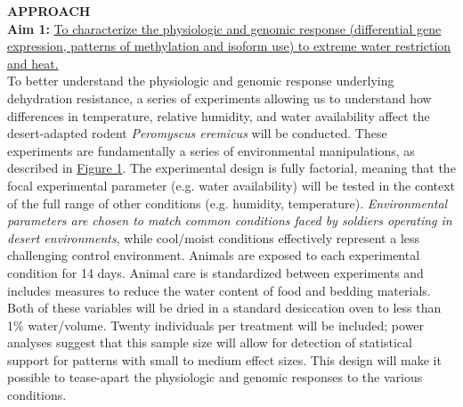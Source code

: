 \documentclass[12pt]{article}
\begin{document}
%
%
% 
%
%
%

\noindent \textbf{APPROACH} \\


\noindent \textbf{Aim 1:} \ul{To characterize the physiologic and genomic response (differential gene expression, patterns of methylation and isoform use) to extreme water restriction and heat.} \\

To better understand the physiologic and genomic response underlying dehydration resistance, a series of experiments allowing us to understand how differences in temperature, relative humidity, and water availability affect the desert-adapted rodent \textit{Peromyscus eremicus} will be conducted. These experiments are fundamentally a series of environmental manipulations, as described in \hyperlink{Figure 1}{Figure 1}. The experimental design is fully factorial, meaning that the focal experimental parameter (e.g. water availability) will be tested in the context of the full range of other conditions (e.g. humidity, temperature). \emph{Environmental parameters are chosen to match common conditions faced by soldiers operating in desert environments}, while cool/moist conditions effectively represent a less challenging control environment. Animals are exposed to each experimental condition for 14 days. Animal care is standardized between experiments and includes measures to reduce the water content of food and bedding materials. Both of these variables will be dried in a standard desiccation oven to less than 1\% water/volume. Twenty individuals per treatment will be included; power analyses suggest that this sample size will allow for detection of statistical support for patterns with small to medium effect sizes. This design will make it possible to tease-apart the physiologic and genomic responses to the various conditions. \\
\end{document}
